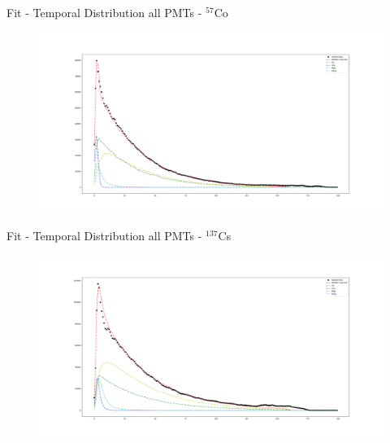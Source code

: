\documentclass{beamer}
\begin{document}
\begin{frame}{Fit - Temporal Distribution all PMTs - $^{57}$Co}
\begin{figure}[h]
\centering
\includegraphics[width=1\textwidth]{Co57Glob.png}
\end{figure}
\end{frame}

\begin{frame}{Fit - Temporal Distribution all PMTs - $^{137}$Cs}
\begin{figure}[h]
\centering
\includegraphics[width=1\textwidth]{CsGlob.png}
\end{figure}
\end{frame}
\end{document}
